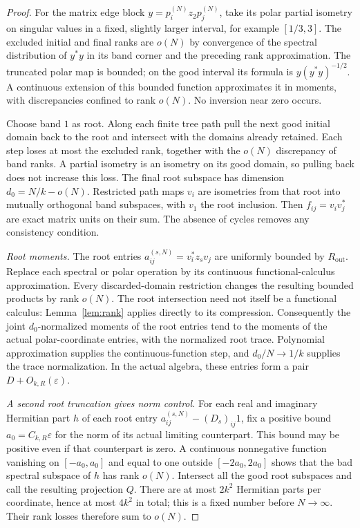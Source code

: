 \documentclass[11pt]{article}
\theoremstyle{definition}\newtheorem{definition}[theorem]{Definition}
\theoremstyle{remark}\newtheorem{remark}[theorem]{Remark}
\newcommand{\eps}{\varepsilon}\newcommand{\id}{\mathrm{id}}
\begin{document}
\begin{proof}
For the matrix edge block $y=p_i^{(N)}z_2p_j^{(N)}$, take its polar
partial isometry on singular values in a fixed, slightly larger
interval, for example $[1/3,3]$. The excluded initial and final ranks
are $o(N)$ by convergence of the spectral distribution of $y^*y$ in
its band corner and the preceding rank approximation. The truncated
polar map is bounded; on the good interval its formula is
$y(y^*y)^{-1/2}$. A continuous extension of this bounded function
approximates it in moments, with discrepancies confined to rank
$o(N)$. No inversion near zero occurs.

Choose band $1$ as root. Along each finite tree path pull the next good
initial domain back to the root and intersect with the domains already
retained. Each step loses at most the excluded rank, together with the
$o(N)$ discrepancy of band ranks. A partial isometry is an isometry
on its good domain, so pulling back does not increase this loss. The
final root subspace has dimension $d_0=N/k-o(N)$. Restricted path
maps $v_i$ are isometries from that root into mutually orthogonal band
subspaces, with $v_1$ the root inclusion. Then
$f_{ij}=v_iv_j^*$ are exact matrix units on their sum.
The absence of cycles removes any consistency condition.

\emph{Root moments.}
The root entries $a_{ij}^{(s,N)}=v_i^*z_sv_j$ are uniformly bounded by
$R_{\mathrm{out}}$. Replace each spectral or polar operation by its
continuous functional-calculus approximation. Every discarded-domain
restriction changes the resulting bounded products by rank $o(N)$.
The root intersection need not itself be a functional calculus:
Lemma~\ref{lem:rank} applies directly to its compression. Consequently
the joint $d_0$-normalized moments of the root entries tend to the
moments of the actual polar-coordinate entries, with the normalized
root trace. Polynomial approximation supplies the continuous-function
step, and $d_0/N\to1/k$ supplies the trace normalization.
In the actual algebra, these entries form a pair $D+O_{k,R}(\eps)$.

\emph{A second root truncation gives norm control.}
For each real and imaginary Hermitian part $h$ of each root entry
$a_{ij}^{(s,N)}-(D_s)_{ij}1$, fix a positive bound
$a_0=C_{k,R}\eps$ for the norm of its actual limiting counterpart.
This bound may be positive even if that counterpart is zero.
A continuous nonnegative function vanishing on $[-a_0,a_0]$ and equal
to one outside $[-2a_0,2a_0]$ shows that the bad spectral subspace of
$h$ has rank $o(N)$. Intersect all the good root subspaces and call
the resulting projection $Q$. There are at most $2k^2$ Hermitian parts
per coordinate, hence at most $4k^2$ in total; this is a fixed number
before $N\to\infty$. Their rank losses therefore sum to $o(N)$.


\end{proof}
\end{document}

